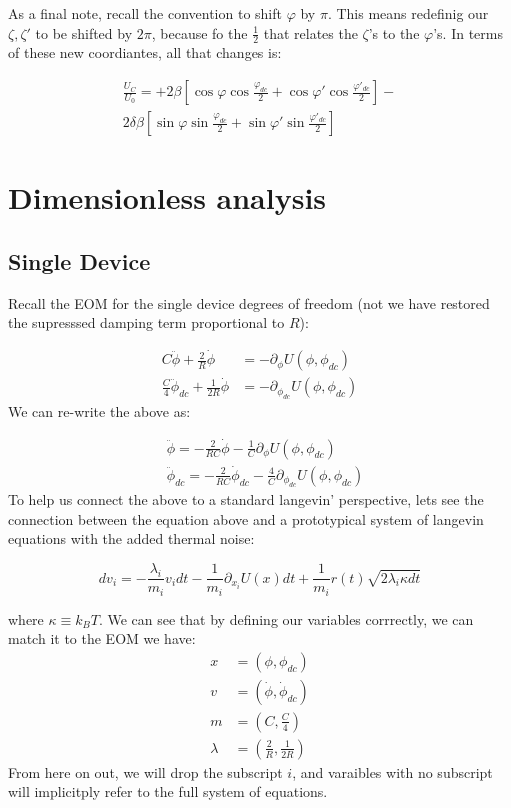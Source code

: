 \documentclass[paper=a4, twocolumn, fontsize=10pt]{article} %
\numberwithin{equation}{section} %
\numberwithin{figure}{section} %
\numberwithin{table}{section} %
\begin{document}
As a final note, recall the convention to shift $\varphi$ by $\pi$. This means redefinig our $\zeta,\zeta'$ to be shifted by $2\pi$, because fo the $\frac{1}{2}$ that relates the $\zeta$'s to the $\varphi$'s. In terms of these new coordiantes, all that changes is:

\begin{multline}
    \frac{U_C}{U_0} = +2\beta \left[ \cos\varphi\cos\frac{\varphi_{dc}}{2} + \cos\varphi'\cos\frac{\varphi'_{dc}}{2} \right] - \\
    2\delta\beta \left[ \sin\varphi\sin\frac{\varphi_{dc}}{2} + \sin\varphi'\sin\frac{\varphi'_{dc}}{2} \right]
\end{multline}



\section{Dimensionless analysis}

\subsection{Single Device}

Recall the EOM for the single device degrees of freedom (not we have restored the supresssed damping term proportional to $R$):

\begin{align}
    C \ddot{\phi} + \frac{2}{R} \dot{\phi} &= - \partial_\phi U(\phi, \phi_{dc})
    \\
    \frac{C}{4} \ddot{\phi}_{dc} + \frac{1}{2R} \dot{\phi} &= - \partial_{\phi_{dc}} U(\phi, \phi_{dc})
    \end{align}
We can re-write the above as:

\begin{align}
    &\ddot{\phi} = -\frac{2}{RC} \dot{\phi} -\frac{1}{C} \partial_\phi U(\phi, \phi_{dc})
    \\
    &\ddot{\phi}_{dc} = -\frac{2}{RC} \dot{\phi}_{dc} - \frac{4}{C}\partial_{\phi_{dc}} U(\phi, \phi_{dc})
    \end{align}
To help us connect the above to a standard langevin' perspective, lets see the connection between the equation above and a prototypical system of langevin equations with the added thermal noise:

\[ dv_i = -\frac{\lambda_i}{m_i} v_i dt - \frac{1}{m_i} \partial_{x_i} U(x) dt + \frac{1}{m_i} r(t)\sqrt{2\lambda_i \kappa dt} \]

where $\kappa\equiv k_B T$. We can see that by defining our variables corrrectly, we can match it to the EOM we have:
\begin{align*}
x &=  (\phi, \phi_{dc}) \\
v &= (\dot{\phi}, \dot{\phi}_{dc}) \\
m &= ( C, \frac{C}{4}) \\
\lambda &= (\frac{2}{R}, \frac{1}{2R})
\end{align*}
From here on out, we will drop the subscript $i$, and varaibles with no subscript will implicitply refer to the full system of equations.\\
\end{document}

